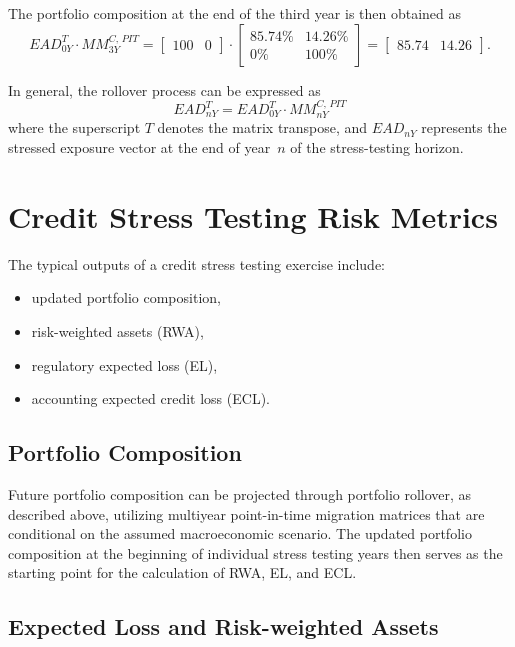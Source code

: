 \documentclass[11pt,a4paper]{article}
\begin{document}
The portfolio composition at the end of the third year is then obtained as
\begin{equation}
EAD_{0Y}^T \cdot MM_{3Y}^{C,\,PIT} =
\begin{bmatrix}
100 & 0
\end{bmatrix}
\cdot
\begin{bmatrix}
85.74\% & 14.26\% \\
0\% & 100\%
\end{bmatrix}
=
\begin{bmatrix}
85.74 & 14.26
\end{bmatrix}.
\end{equation}

In general, the rollover process can be expressed as
\begin{equation}
EAD_{nY}^T = EAD_{0Y}^T \cdot MM_{nY}^{C,\,PIT}
\end{equation}
where the superscript $T$ denotes the matrix transpose, and $EAD_{nY}$ represents the stressed exposure vector at the end of year~$n$ of the stress-testing horizon.

\section{Credit Stress Testing Risk Metrics}

The typical outputs of a credit stress testing exercise include:
\begin{itemize}
\item updated portfolio composition,
\item risk-weighted assets (RWA),
\item regulatory expected loss (EL),
\item accounting expected credit loss (ECL).
\end{itemize}

\subsection{Portfolio Composition}

Future portfolio composition can be projected through portfolio rollover, as described above, utilizing multiyear point-in-time migration matrices that are conditional on the assumed macroeconomic scenario. The updated portfolio composition at the beginning of individual stress testing years then serves as the starting point for the calculation of RWA, EL, and ECL.

\subsection{Expected Loss and Risk-weighted Assets}
\end{document}

